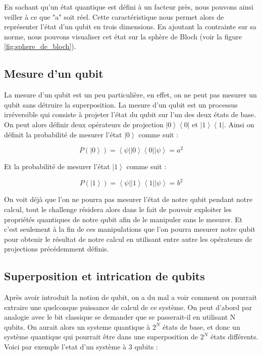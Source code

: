 \documentclass{article}
\begin{document}
\begin{multicols}{2}
En sachant qu'un état quantique est défini à un facteur près, nous pouvons ainsi veiller à ce que "a" soit réel. Cette caractéristique nous permet alors de représenter l'état d'un qubit en trois dimensions. En ajoutant la contrainte sur sa norme, nous pouvons visualiser cet état sur la sphère de Bloch  (voir la figure \autoref{fig:sphere_de_bloch}).

\subsection{Mesure d'un qubit}

La mesure d'un qubit est un peu particulière, en effet, on ne peut pas mesurer un qubit sans détruire la superposition.
La mesure d'un qubit est un processus irréversible qui consiste à projeter l'état du qubit sur l'un des deux états de base.
On peut alors définir deux opérateurs de projection $\left|0\right>\left<0\right|$ et $\left|1\right>\left<1\right|$.
Ainsi on définit la probabilité de mesurer l'état $\left|0\right>$ comme suit :

\begin{equation}
    P(\left|0\right>) = \left<\psi\right|\left|0\right>\left<0\right|\left|\psi\right> = a^2
\end{equation}

Et la probabilité de mesurer l'état $\left|1\right>$ comme suit :

\begin{equation}
    P(\left|1\right>) = \left<\psi\right|\left|1\right>\left<1\right|\left|\psi\right> = b^2
\end{equation}

On voit déjà que l'on ne pourra pas mesurer l'état de notre qubit pendant notre calcul, tout le challenge résidera alors dans le fait de pouvoir exploiter les propriétés quantiques de notre qubit afin de le manipuler sans le mesurer. Et c'est seulement à la fin de ces manipulations que l'on pourra mesurer notre qubit pour obtenir le résultat de notre calcul en utilisant entre autre les opérateurs de projections précédemment définis.

\subsection{Superposition et intrication de qubits}

Après avoir introduit la notion de qubit, on a du mal a voir comment on pourrait extraire une quelconque puissance de calcul de ce système. 
On peut d'abord par analogie avec le bit classique se demander que se passerait-il en utilisant N qubits. 
On aurait alors un systeme quantique à $2^N$ états de base, et donc un système quantique qui pourrait être dans une superposition de $2^N$ états différents.
Voici par exemple l'etat d'un système à 3 qubits :


\end{multicols}
\end{document}
